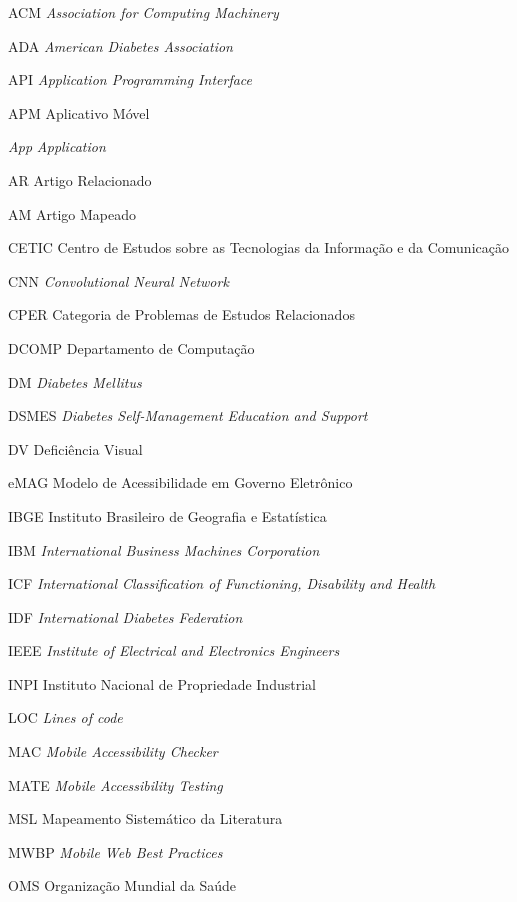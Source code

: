 
\begin{siglas}
	\item[ACM]{\textit{Association for Computing Machinery}}
	\item[ADA]{\textit{American Diabetes Association}}
	\item[API]{\textit{Application Programming Interface}}
	\item[APM]{Aplicativo Móvel}
	\item[\emph{App}]{\textit{Application}}
	\item[AR]{Artigo Relacionado}
	\item[AM]{Artigo Mapeado}
	\item[CETIC]{Centro de Estudos sobre as Tecnologias da Informação e da Comunicação}
	\item[CNN]{\textit{Convolutional Neural Network}}
	\item[CPER]{Categoria de Problemas de Estudos Relacionados}
	\item[DCOMP]{Departamento de Computação}
	\item[DM]{\emph{Diabetes Mellitus}}
	\item[DSMES]{\textit{Diabetes Self-Management Education and Support}}
	\item[DV]{Deficiência Visual}
	\item[eMAG]{Modelo de Acessibilidade em Governo Eletrônico}
	\item[IBGE]{Instituto Brasileiro de Geografia e Estatística}
	\item[IBM]{\textit{International Business Machines Corporation}}
	\item[ICF]{\textit{International Classification of Functioning, Disability and Health}}
	\item[IDF]{\textit{International Diabetes Federation}}
	\item[IEEE]{\textit{Institute of Electrical and Electronics Engineers}}
	\item[INPI]{Instituto Nacional de Propriedade Industrial}
	\item[LOC]{\textit{Lines of code}}
	\item[MAC]{\textit{Mobile Accessibility Checker}}
	\item[MATE]{\textit{Mobile Accessibility Testing}}
	\item[MSL]{Mapeamento Sistemático da Literatura}
	\item[MWBP]{\textit{Mobile Web Best Practices}}
	\item[OMS]{Organização Mundial da Saúde}

\end{siglas}
